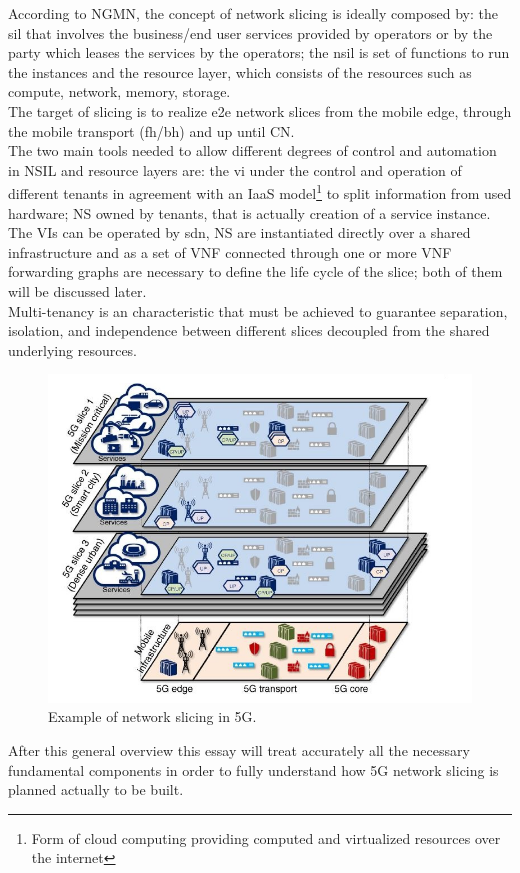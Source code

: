 \documentclass[a4paper,12pt]{report} %
\begin{document}
According to NGMN, the concept of network slicing is ideally composed by: the \gls{sil} that involves the business/end user services provided by operators or by the party which leases the services by the operators; the \gls{nsil} is set of functions to run the instances and the resource layer, which consists of the
resources such as compute, network, memory, storage.\\
The target of slicing is to realize
\gls{e2e} network slices from the mobile edge,
through the mobile transport (\gls{fh}/\gls{bh}) and up until
\gls{CN}.\\
The two main tools needed to allow different degrees
of control and automation in NSIL and resource layers are: the \gls{vi} under the control and operation
of different tenants in agreement with an \gls{IaaS} model\footnote{Form of cloud computing providing computed and virtualized resources over the internet} to split information from used hardware; \gls{NS} owned by tenants, that is actually creation of a service instance.
The VIs can be operated by \gls{sdn}, NS are instantiated directly over a shared infrastructure
and as a set of \gls{VNF} connected through
one or more VNF forwarding graphs are necessary to define the life cycle of the slice; both of them will be discussed later.\\
Multi-tenancy is an characteristic that must be achieved to guarantee separation, isolation, and independence between
different slices decoupled from the shared underlying resources.\\
\begin{figure}[H]
\centering
\includegraphics[scale=0.65]{pics/1.JPG}
\caption{Example of network slicing in 5G. \cite{al20185g}}
\label{layers}
\end{figure}
After this general overview this essay will treat accurately all the necessary fundamental components in order to fully understand how 5G network slicing is planned actually to be built. \cite{al20185g} \cite{marsch20185g}
\end{document}
